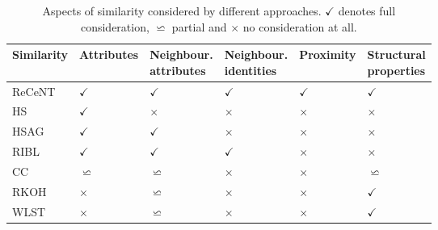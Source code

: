 \begin{table}
    \centering

    \caption{Aspects of similarity considered by different approaches. $\checkmark$ denotes full consideration, $\backsimeq$ partial and $\times$ no consideration at all.  }
    \label{tab:Props}
    \begin{tabular}{@{}llllll@{}}
        \toprule
        \textbf{Similarity}  & {\footnotesize\textbf{Attributes}} & \makecell{\footnotesize\textbf{Neighbour.} \\ \footnotesize\textbf{attributes}} & \makecell{\footnotesize\textbf{Neighbour.} \\ \footnotesize\textbf{identities}}  & {\footnotesize\textbf{Proximity}} & \makecell{\footnotesize\textbf{Structural} \\ \footnotesize\textbf{properties}}    \\
        \midrule
         ReCeNT                & $\checkmark$        & $\checkmark$                      & $\checkmark$                        & $\checkmark$       & $\checkmark$ \\

         HS                  & $\checkmark$        & $\times$                          & $\times$                            & $\times$           & $\times$   \\

         HSAG                & $\checkmark$        & $\checkmark$                      & $\times$                            & $\times$           & $\times$   \\

         RIBL                & $\checkmark$        & $\checkmark$                      & $\checkmark$                        & $\times$           & $\times$  \\

         CC                  & $\backsimeq$        & $\backsimeq$                      & $\times$                            & $\times$           & $\backsimeq$   \\

         RKOH                & $\times$            & $\backsimeq$                      & $\times$                            & $\times$           & $\checkmark$ \\

         WLST                & $\times$            & $\backsimeq$                      & $\times$                            & $\times$           & $\checkmark$ \\
         \bottomrule
    \end{tabular}

\end{table}


